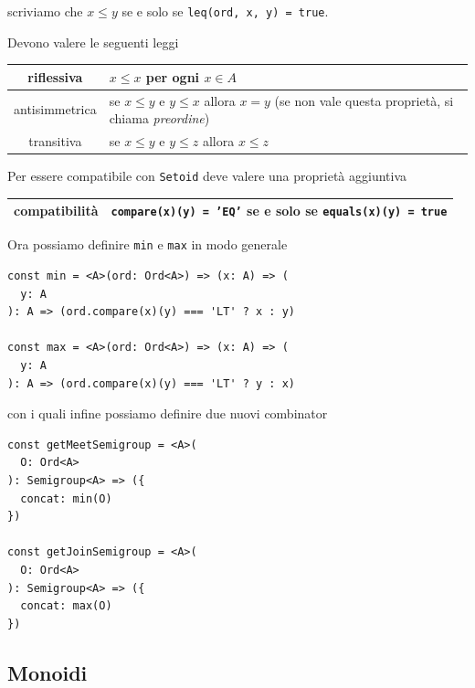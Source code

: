 \documentclass[12pt]{article}
\begin{document}
scriviamo che $x \leq y$ se e solo se \texttt{leq(ord, x, y) = true}.

Devono valere le seguenti leggi

\begin{center}
\bgroup
\def\arraystretch{1.5}
\begin{tabular}{ |c|p{10cm}| }
\hline
riflessiva & $x \leq x$ per ogni $x \in A$ \\
\hline
antisimmetrica & se $x \leq y$ e $y \leq x$ allora $x = y$ (se non vale questa proprietà, si chiama \emph{preordine}) \\
\hline
transitiva & se $x \leq y$ e $y \leq z$ allora $x \leq z$ \\
\hline
\end{tabular}
\egroup
\end{center}

Per essere compatibile con \texttt{Setoid} deve valere una proprietà aggiuntiva

\begin{center}
\bgroup
\def\arraystretch{1.5}
\begin{tabular}{ |c|p{10cm}| }
\hline
compatibilità & \texttt{compare(x)(y) = 'EQ'} se e solo se \texttt{equals(x)(y) = true} \\
\hline
\end{tabular}
\egroup
\end{center}

Ora possiamo definire \texttt{min} e \texttt{max} in modo generale

\begin{verbatim}
const min = <A>(ord: Ord<A>) => (x: A) => (
  y: A
): A => (ord.compare(x)(y) === 'LT' ? x : y)

const max = <A>(ord: Ord<A>) => (x: A) => (
  y: A
): A => (ord.compare(x)(y) === 'LT' ? y : x)
\end{verbatim}

con i quali infine possiamo definire due nuovi combinator

\begin{verbatim}
const getMeetSemigroup = <A>(
  O: Ord<A>
): Semigroup<A> => ({
  concat: min(O)
})

const getJoinSemigroup = <A>(
  O: Ord<A>
): Semigroup<A> => ({
  concat: max(O)
})
\end{verbatim}

\subsection{Monoidi}
\end{document}
